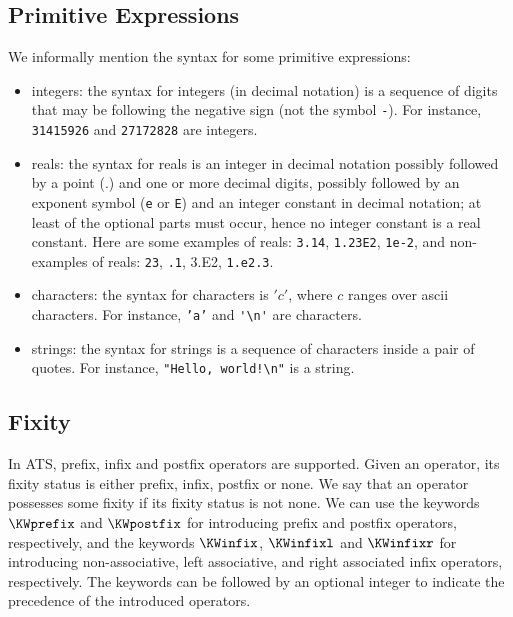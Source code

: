 \subsection{Primitive Expressions}
We informally mention the syntax for some primitive expressions:
\begin{itemize}
\item integers: the syntax for integers (in decimal notation)
is a sequence of digits that may be following the negative sign
\texttt{}
(not the symbol \texttt{-}). For instance, \texttt{31415926} and
\texttt{{}27172828} are integers.

\item reals:
the syntax for reals is an integer in decimal notation possibly followed by
a point (.) and one or more decimal digits, possibly followed by an
exponent symbol (\texttt{e} or \texttt{E}) and an integer constant in
decimal notation; at least of the optional parts must occur, hence no
integer constant is a real constant.  Here are some examples of reals:
\texttt{3.14}, \texttt{1.23E2},
\texttt{1e-2}, and non-examples of reals: \texttt{23},
\texttt{.1}, {3.E2}, \texttt{1.e2.3}.

\item
characters: the syntax for characters is $'c'$, where $c$ ranges over ascii
characters. For instance, \texttt{'a'} and \verb`'\n'` are characters.

\item
strings: the syntax for strings is a sequence of characters inside a pair
of quotes. For instance, \verb`"Hello, world!\n"` is a string.
\end{itemize}

\subsection{Fixity}
In ATS, prefix, infix and postfix operators are supported. Given an
operator, its {fixity status} is either prefix, infix, postfix or none.  We
say that an operator possesses some fixity if its fixity status is not
none.  We can use the keywords $\KWprefix$ and $\KWpostfix$ for introducing
prefix and postfix operators, respectively, and the keywords $\KWinfix$,
$\KWinfixl$ and $\KWinfixr$ for introducing non-associative, left
associative, and right associated infix operators, respectively. The
keywords can be followed by an optional integer to indicate the precedence
of the introduced operators.

